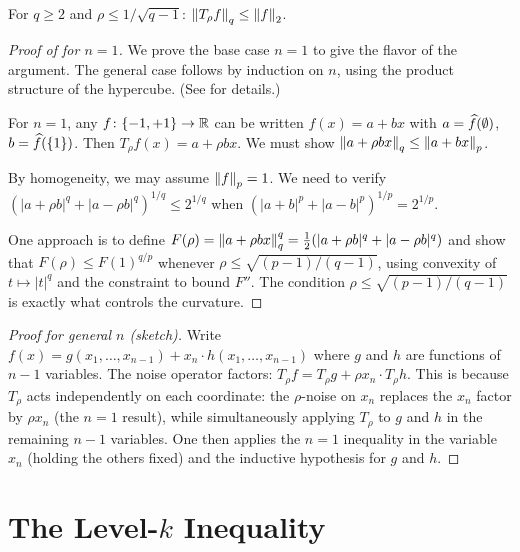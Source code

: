 \begin{corollary}[$2 \to q$ hypercontractivity]\label{cor:2-to-q}
For $q \geq 2$ and $\rho \leq 1/\sqrt{q-1}$:
$\left\| T_\rho f \right\|_q \leq \left\| f \right\|_2$.
\end{corollary}

\begin{proof}[Proof of  for $n=1$]
We prove the base case $n=1$ to give the flavor of the argument. The
general case follows by induction on $n$, using the product structure of
the hypercube. (See \citet[Chapter~9]{odonnell2014analysis} for details.)

For $n=1$, any $f \colon \{-1,+1\} \to \mathbb{R}$ can be written
$f(x) = a + bx$ with $a = \widehat{f}(\emptyset)$, $b = \widehat{f}(\{1\})$.
Then $T_\rho f(x) = a + \rho b x$. We must show
$\left\| a + \rho bx \right\|_q \leq \left\| a + bx \right\|_p$.

By homogeneity, we may assume $\left\| f \right\|_p = 1$. We need to verify
$(|a + \rho b|^q + |a - \rho b|^q)^{1/q}
\leq 2^{1/q}$ when $(|a+b|^p + |a-b|^p)^{1/p} = 2^{1/p}$.

One approach is to define $F(\rho) = \left\| a + \rho b x \right\|_q^q
= \tfrac{1}{2}(|a+\rho b|^q + |a - \rho b|^q)$ and show that
$F(\rho) \leq F(1)^{q/p}$ whenever $\rho \leq \sqrt{(p-1)/(q-1)}$,
using convexity of $t \mapsto |t|^q$ and the constraint to bound $F''$.
The condition $\rho \leq \sqrt{(p-1)/(q-1)}$ is exactly what controls
the curvature.
\end{proof}

\begin{proof}[Proof for general $n$ (sketch)]
Write $f(x) = g(x_1, \ldots, x_{n-1}) + x_n \cdot h(x_1, \ldots, x_{n-1})$
where $g$ and $h$ are functions of $n-1$ variables. The noise operator
factors: $T_\rho f = T_\rho g + \rho x_n \cdot T_\rho h$. This is
because $T_\rho$ acts independently on each coordinate: the $\rho$-noise
on $x_n$ replaces the $x_n$ factor by $\rho x_n$ (the $n=1$ result),
while simultaneously applying $T_\rho$ to $g$ and $h$ in the remaining
$n-1$ variables. One then applies the $n=1$ inequality in the variable
$x_n$ (holding the others fixed) and the inductive hypothesis for $g$
and $h$.
\end{proof}


\section{The Level-$k$ Inequality}\label{sec:level-k}

